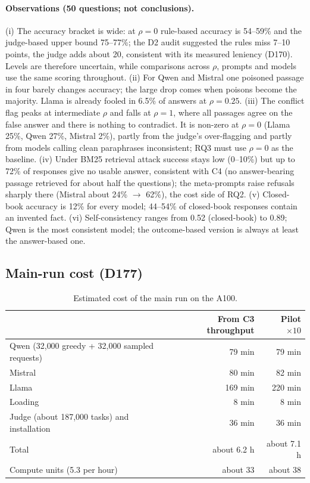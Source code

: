 \documentclass[11pt,a4paper]{report}
\begin{document}
\paragraph{Observations (50 questions; not conclusions).}
(i) The accuracy bracket is wide: at $\rho=0$ rule-based accuracy is
54--59\% and the judge-based upper bound 75--77\%; the D2 audit suggested the
rules miss 7--10 points, the judge adds about 20, consistent with its measured
leniency (D170). Levels are therefore uncertain, while comparisons across
$\rho$, prompts and models use the same scoring throughout.
(ii) For Qwen and Mistral one poisoned passage in four barely changes accuracy;
the large drop comes when poisons become the majority. Llama is already fooled
in 6.5\% of answers at $\rho=0.25$.
(iii) The conflict flag peaks at intermediate $\rho$ and falls at $\rho=1$,
where all passages agree on the false answer and there is nothing to
contradict. It is non-zero at $\rho=0$ (Llama 25\%, Qwen 27\%, Mistral 2\%),
partly from the judge's over-flagging and partly from models calling clean
paraphrases inconsistent; RQ3 must use $\rho=0$ as the baseline.
(iv) Under BM25 retrieval attack success stays low (0--10\%) but up to 72\% of
responses give no usable answer, consistent with C4 (no answer-bearing passage
retrieved for about half the questions); the meta-prompts raise refusals
sharply there (Mistral about 24\% $\rightarrow$ 62\%), the cost side of RQ2.
(v) Closed-book accuracy is 12\% for every model; 44--54\% of closed-book
responses contain an invented fact.
(vi) Self-consistency ranges from 0.52 (closed-book) to 0.89; Qwen is the most
consistent model; the outcome-based version is always at least the
answer-based one.

\subsection{Main-run cost (D177)}
\begin{table}[h]
\centering
\begin{tabular}{lrr}
\hline
 & From C3 throughput & Pilot $\times 10$ \\
\hline
Qwen (32{,}000 greedy + 32{,}000 sampled requests) & 79 min & 79 min \\
Mistral & 80 min & 82 min \\
Llama & 169 min & 220 min \\
Loading & 8 min & 8 min \\
Judge (about 187{,}000 tasks) and installation & 36 min & 36 min \\
\hline
Total & about 6.2 h & about 7.1 h \\
Compute units (5.3 per hour) & about 33 & about 38 \\
\hline
\end{tabular}
\caption{Estimated cost of the main run on the A100.}
\end{table}
\end{document}
